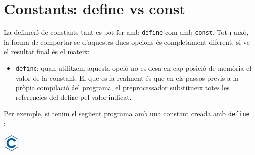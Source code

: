 \documentclass[]{book}
\newenvironment{Shaded}{\begin{snugshade}}{\end{snugshade}}
\newcommand{\DataTypeTok}[1]{\textcolor[rgb]{0.13,0.29,0.53}{#1}}
\newcommand{\DecValTok}[1]{\textcolor[rgb]{0.00,0.00,0.81}{#1}}
\newcommand{\CharTok}[1]{\textcolor[rgb]{0.31,0.60,0.02}{#1}}
\newcommand{\SpecialCharTok}[1]{\textcolor[rgb]{0.00,0.00,0.00}{#1}}
\newcommand{\StringTok}[1]{\textcolor[rgb]{0.31,0.60,0.02}{#1}}
\newcommand{\ImportTok}[1]{#1}
\newcommand{\CommentTok}[1]{\textcolor[rgb]{0.56,0.35,0.01}{\textit{#1}}}
\newcommand{\ControlFlowTok}[1]{\textcolor[rgb]{0.13,0.29,0.53}{\textbf{#1}}}
\newcommand{\PreprocessorTok}[1]{\textcolor[rgb]{0.56,0.35,0.01}{\textit{#1}}}
\newcommand{\NormalTok}[1]{#1}
\providecommand{\tightlist}{%
  \setlength{\itemsep}{0pt}\setlength{\parskip}{0pt}}
\begin{document}
\section{Constants: define vs const}\label{constants-define-vs-const}

La definició de constants tant es pot fer amb \texttt{define} com amb
\texttt{const}. Tot i això, la forma de comportar-se d'aquestes dues
opcions és completament diferent, si ve el resultat final és el mateix:

\begin{itemize}
\tightlist
\item
  \texttt{define}: quan utilitzem aquesta opció no es desa en cap
  posició de memòria el valor de la constant. El que es fa realment és
  que en els passos previs a la pròpia compilació del programa, el
  preprocessador substitueix totes les referencies del define pel valor
  indicat.
\end{itemize}

Per exemple, si tenim el següent programa amb una constant creada amb
\texttt{define} :

\includegraphics{./img/c.png}

\begin{Shaded}
\end{Shaded}
\end{document}
